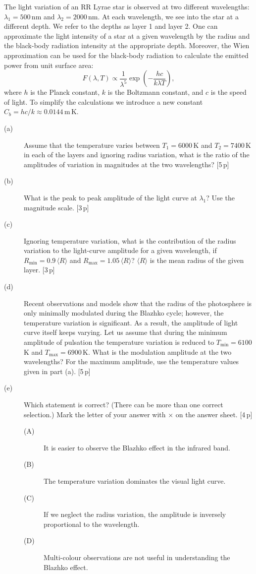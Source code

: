 The light variation of an RR Lyrae star is observed at two different
wavelengths: $\lambda_1 = 500$\,nm and $\lambda_2 = 2000$\,nm. At each
wavelength, we see into the star at a different depth. We refer to the depths
as layer 1 and layer 2. One can approximate the light intensity of a star at
a given wavelength by the radius and the black-body radiation intensity at
the appropriate depth. Moreover, the Wien approximation can be used for the
black-body radiation to calculate the emitted power from unit surface area:
\[ F(\lambda, T) \propto \frac{1}{\lambda^5}
   \exp\left(-\frac{hc}{k\lambda T}\right), \]
where $h$ is the Planck constant, $k$ is the Boltzmann constant, and $c$ is
the speed of light. To simplify the calculations we introduce a new constant
$C_b = hc/k \approx 0.0144$\,m\,K.

\begin{description}
\item[(a)] Assume that the temperature varies between $T_1 = 6000$\,K and
  $T_2 = 7400$\,K in each of the layers and ignoring radius variation, what
  is the ratio of the amplitudes of variation in magnitudes at the two
  wavelengths? \hfill[5\,p]
\item[(b)] What is the peak to peak amplitude of the light curve at
  $\lambda_1$? Use the magnitude scale. \hfill[3\,p]
\item[(c)] Ignoring temperature variation, what is the contribution of the
  radius variation to the light-curve amplitude for a given wavelength, if
  $R_{\min} = 0.9\,\langle R\rangle$ and
  $R_{\max} = 1.05\,\langle R\rangle$? $\langle R\rangle$ is the mean radius
  of the given layer. \hfill[3\,p]
\item[(d)] Recent observations and models show that the radius of the
  photosphere is only minimally modulated during the Blazhko cycle; however,
  the temperature variation is significant. As a result, the amplitude of
  light curve itself keeps varying. Let us assume that during the minimum
  amplitude of pulsation the temperature variation is reduced to
  $T_{\min} = 6100$\,K and $T_{\max} = 6900$\,K. What is the modulation
  amplitude at the two wavelengths? For the maximum amplitude, use the
  temperature values given in part (a). \hfill[5\,p]
\item[(e)] Which statement is correct? (There can be more than one correct
  selection.) Mark the letter of your answer with $\times$ on the answer
  sheet. \hfill[4\,p]
  \begin{description}
  \item[(A)] It is easier to observe the Blazhko effect in the infrared
    band.
  \item[(B)] The temperature variation dominates the visual light curve.
  \item[(C)] If we neglect the radius variation, the amplitude is inversely
    proportional to the wavelength.
  \item[(D)] Multi-colour observations are not useful in understanding the
    Blazhko effect.
  \end{description}
\end{description}


